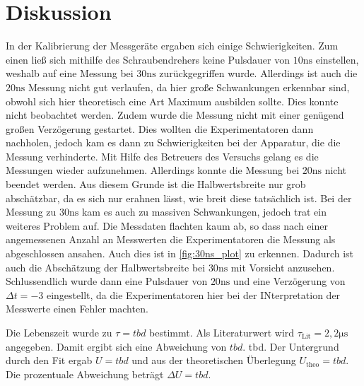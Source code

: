 \section{Diskussion}
\label{sec:Diskussion}

In der Kalibrierung der Messgeräte ergaben sich einige Schwierigkeiten.
Zum einen ließ sich mithilfe des Schraubendrehers keine Pulsdauer von $10 \unit{\nano\second}$ einstellen, weshalb auf eine Messung bei $30 \unit{\nano\second}$ zurückgegriffen wurde.
Allerdings ist auch die $20 \unit{\nano\second}$ Messung nicht gut verlaufen, da hier große Schwankungen erkennbar sind, obwohl sich hier theoretisch eine Art Maximum ausbilden sollte.
Dies konnte nicht beobachtet werden.
Zudem wurde die Messung nicht mit einer genügend großen Verzögerung gestartet.
Dies wollten die Experimentatoren dann nachholen, jedoch kam es dann zu Schwierigkeiten bei der Apparatur, die die Messung verhinderte.
Mit Hilfe des Betreuers des Versuchs gelang es die Messungen wieder aufzunehmen.
Allerdings konnte die Messung bei $20 \unit{\nano\second}$ nicht beendet werden.
Aus diesem Grunde ist die Halbwertsbreite nur grob abschätzbar, da es sich nur erahnen lässt, wie breit diese tatsächlich ist.
Bei der Messung zu $30 \unit{\nano\second}$ kam es auch zu massiven Schwankungen, jedoch trat ein weiteres Problem auf.
Die Messdaten flachten kaum ab, so dass nach einer angemessenen Anzahl an Messwerten die Experimentatoren die Messung als abgeschlossen ansahen.
Auch dies ist in \autoref{fig:30ns_plot} zu erkennen.
Dadurch ist auch die Abschätzung der Halbwertsbreite bei $30 \unit{\nano\second}$ mit Vorsicht anzusehen.
Schlussendlich wurde dann eine Pulsdauer von $20 \unit{\nano\second}$ und eine Verzögerung von $\Delta t = -3$ eingestellt, da die Experimentatoren hier bei der INterpretation der Messwerte einen Fehler machten.

Die Lebenszeit wurde zu $\tau = tbd$ bestimmt.
Als Literaturwert wird $\tau_\text{Lit} = 2,2 \unit{\micro\second}$ angegeben.
Damit ergibt sich eine Abweichung von $tbd$.
tbd.
Der Untergrund durch den Fit ergab $U = tbd$ und aus der theoretischen Überlegung $U_\text{theo} = tbd$.
Die prozentuale Abweichung beträgt $\Delta U = tbd$.